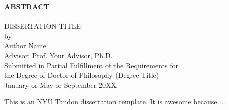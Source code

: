 
\begin{center}

\sffamily
\LARGE
\textbf{ABSTRACT} \\
\HRule \\
\textsc{
\textrm{DISSERTATION TITLE}}\\[0.25cm]

\normalsize{by} \\[0.5cm]
\Large
\textrm{
Author Name\\[0.5cm]
Advisor: Prof. Your Advisor, Ph.D.}\\[.5cm]

\normalsize
\textrm{Submitted in Partial Fulfillment of the Requirements for \\
the Degree of Doctor of Philosophy (Degree Title)} \\[0.5cm]

\textrm{
January or May or September 20XX} \\[1cm]

\end{center}

\normalsize
This is an NYU Tandon dissertation template. It is awesome because ...
